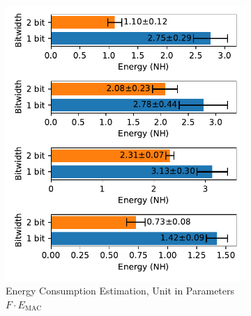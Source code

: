         \begin{figure}[H]
            \centering
            \begin{subfigure}[H]{0.48\textwidth}
                \includegraphics[width=\textwidth]{../timesteps/FashionMNIST/plots/fashionmnist_test_energy_nh.pdf}
                \caption{Energy Consumption Estimation, Unit in Parameters $F\cdot E_{\text{MAC}}$}
            \end{subfigure}
            \hfill
            \begin{subfigure}[H]{0.48\textwidth}

\end{subfigure}
\end{figure}
